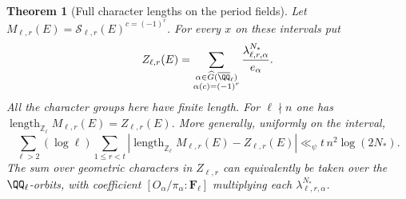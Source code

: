 \documentclass[a4paper,11pt]{article}
\newtheorem{theorem}[proposition]{Theorem}
\theoremstyle{definition}
\theoremstyle{remark}
\newcommand{\ZZ}{\mathbb Z}\newcommand{\ord}{\operatorname{ord}}
\newcommand{\len}{\operatorname{length}}\newcommand{\Res}{\operatorname*{Res}}
\numberwithin{equation}{section}
\begin{document}
\begin{theorem}[Full character lengths on the period fields]\leavevmode\label{thm:levelstrict345}
Let $M_{\ell,r}(E)=\mathcal S_{\ell,r}(E)^{c=(-1)^r}$.
For every $x$ on these intervals put
\[
 Z_{\ell,r}(E)=
   \sum_{\substack{\alpha\in\widehat G(\overline{\QQ}_\ell)\\
                       \alpha(c)=(-1)^r}}
       \frac{\lambda^{N_*}_{\ell,r,\alpha}}{e_\alpha}.
\]
All the character groups here have finite length. For $\ell\nmid n$
one has $\len_{\ZZ_\ell}M_{\ell,r}(E)=Z_{\ell,r}(E)$. More generally,
uniformly on the interval,
\[
 \sum_{\ell>2}(\log\ell)\sum_{1\le r<t}
 \left|\len_{\ZZ_\ell}M_{\ell,r}(E)-Z_{\ell,r}(E)\right|
       \ll_\psi t\,n^2\log(2N_*).
\]
The sum over geometric characters in $Z_{\ell,r}$ can equivalently
be taken over the $\QQ_\ell$-orbits, with coefficient
$[O_\alpha/\pi_\alpha:\mathbf F_\ell]$ multiplying each
$\lambda^{N_*}_{\ell,r,\alpha}$.
\end{theorem}
\end{document}
